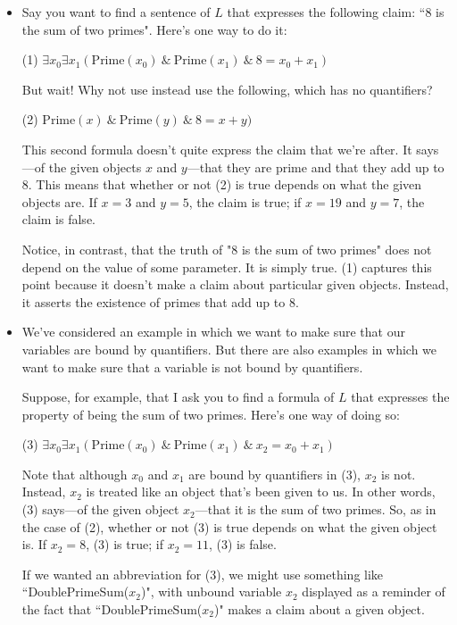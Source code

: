 \documentclass[12pt,a4paper]{article}
\begin{document}
\begin{itemize}

\item Say you want to find a sentence of $L$ that expresses the following claim: ``$8$ is the sum of two primes". Here's one way to do it:

(1) $\exists x_0 \exists x_1 (\text{Prime}(x_0) \ \& \ \text{Prime}(x_1) \ \& \ 8 = x_0 + x_1)$

But wait! Why not use instead use the following, which has no quantifiers?

(2) $\text{Prime}(x) \ \& \ \text{Prime}(y) \ \& \ 8 = x + y)$

This second formula doesn't quite express the claim that we're after. It says---of the given objects $x$ and $y$---that they are prime and that they add up to 8. This means that whether or not (2) is true depends on what the given objects are. If $x = 3$ and $y = 5$, the claim is true; if $x = 19$ and $y = 7$, the claim is false.

Notice, in contrast, that the truth of "$8$ is the sum of two primes" does not depend on the value of some parameter. It is simply true. (1) captures this point because it doesn't make a claim about particular given objects. Instead, it asserts the existence of primes that add up to $8$.

\item We've considered an example in which we want to make sure that our variables are bound by quantifiers. But there are also examples in which we want to make sure that a variable is not bound by quantifiers.

Suppose, for example, that I ask you to find a formula of $L$ that expresses the property of being the sum of two primes. Here's one way of doing so:

(3) $\exists x_0 \exists x_1 (\text{Prime}(x_0) \ \& \ \text{Prime}(x_1) \ \& \ x_2 = x_0 + x_1)$

Note that although $x_0$ and $x_1$ are bound by quantifiers in (3), $x_2$ is not. Instead, $x_2$ is treated like an object that's been given to us. In other words, (3) says---of the given object $x_2$---that it is the sum of two primes. So, as in the case of (2), whether or not (3) is true depends on what the given object is. If $x_2 = 8$, (3) is true; if $x_2 = 11$, (3) is false.

If we wanted an abbreviation for (3), we might use something like ``DoublePrimeSum($x_2$)", with unbound variable $x_2$ displayed as a reminder of the fact that ``DoublePrimeSum($x_2$)" makes a claim about a given object.


\end{itemize}
\end{document}
